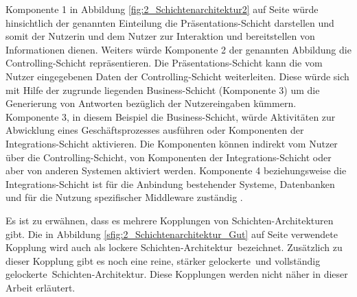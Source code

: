 Komponente 1 in Abbildung \ref{fig:2_Schichtenarchitektur2} auf Seite \pageref{fig:2_Schichtenarchitektur2} würde hinsichtlich der genannten Einteilung die Präsentations-Schicht darstellen und somit der Nutzerin und dem Nutzer zur Interaktion und bereitstellen von Informationen dienen. Weiters würde Komponente 2 der genannten Abbildung die Controlling-Schicht repräsentieren. Die Präsentations-Schicht kann die vom Nutzer eingegebenen Daten der Controlling-Schicht weiterleiten. Diese würde sich mit Hilfe der zugrunde liegenden Business-Schicht (Komponente 3) um die Generierung von Antworten bezüglich der Nutzereingaben kümmern. Komponente 3, in diesem Beispiel die Business-Schicht, würde Aktivitäten zur Abwicklung eines Geschäftsprozesses ausführen oder Komponenten der Integrations-Schicht aktivieren. Die Komponenten können indirekt vom Nutzer über die Controlling-Schicht, von Komponenten der Integrations-Schicht oder aber von anderen Systemen aktiviert werden. Komponente 4 beziehungsweise die Integrations-Schicht ist für die Anbindung bestehender Systeme, Datenbanken und für die Nutzung spezifischer Middleware zuständig \citereset \autocite[siehe][S. 22-25]{Andresen.2003}.

Es ist zu erwähnen, dass es mehrere Kopplungen von Schichten-Architekturen gibt. Die in Abbildung \ref{sfig:2_Schichtenarchitektur_Gut} auf Seite \pageref{sfig:2_Schichtenarchitektur_Gut} verwendete Kopplung wird auch als \glqq lockere Schichten-Architektur\grqq\ bezeichnet. Zusätzlich zu dieser Kopplung gibt es noch eine \glqq reine\grqq , \glqq stärker gelockerte\grqq\ und \glqq vollständig gelockerte\grqq\ Schichten-Architektur. Diese Kopplungen werden nicht näher in dieser Arbeit erläutert.